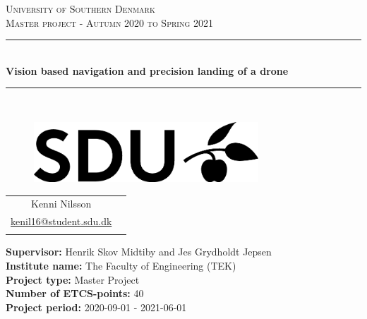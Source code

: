 \documentclass[Report.tex]{subfiles}
\begin{document}
\begin{titlepage}
\begin{center}
\textsc{\LARGE University of Southern Denmark}\\[1.5cm]

\textsc{\large Master project - Autumn 2020 to Spring 2021}\\[0.5cm]
\rule{\linewidth}{0.5mm}\\[0.2cm]
{ \LARGE \bfseries Vision based navigation and precision landing of a drone \\[0.4cm]}
\rule{\linewidth}{0.5mm}\\[1.2cm]

\vspace{2.5cm}

    \begin{figure}[h!]
    \centering
    \includegraphics[width=0.75\textwidth]{../Figures/SDUlogo.png}
    \label{fig:SDUlogo}\\
    [2.5cm]
    \end{figure}


\begin{tabular}{cc}
	\cline{1-1}
	\\
    Kenni Nilsson\\
    \href{mailto:kenil16@student.sdu.dk}{kenil16@student.sdu.dk} \\
	\\	
\end{tabular}	

\vfill

\textbf{Supervisor:} Henrik Skov Midtiby and Jes Grydholdt Jepsen \\
\textbf{Institute name:} The Faculty of Engineering (TEK) \\
\textbf{Project type:} Master Project \\
\textbf{Number of ETCS-points:} 40 \\
\textbf{Project period:} 2020-09-01 - 2021-06-01
\mbox{}\\

\end{center}
\end{titlepage}
\end{document}
